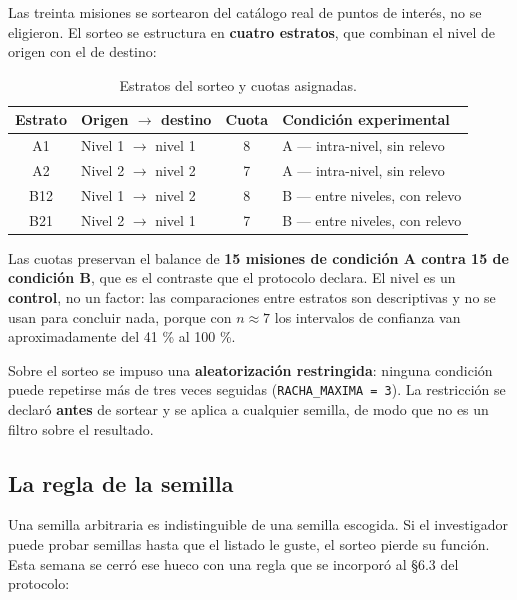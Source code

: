 \documentclass[12pt,letterpaper]{article}
\begin{document}
Las treinta misiones se sortearon del catálogo real de puntos de interés, no se eligieron. El sorteo se estructura en \textbf{cuatro estratos}, que combinan el nivel de origen con el de destino:

\begin{table}[H]
    \centering
    \small
    \caption{Estratos del sorteo y cuotas asignadas.}
    \label{tab:estratos}
    \begin{tabular}{@{}clcp{5.4cm}@{}}
        \toprule
        \textbf{Estrato} & \textbf{Origen $\rightarrow$ destino} & \textbf{Cuota} & \textbf{Condición experimental} \\ \midrule
        A1 & Nivel 1 $\rightarrow$ nivel 1 & 8 & A --- intra-nivel, sin relevo \\ \addlinespace
        A2 & Nivel 2 $\rightarrow$ nivel 2 & 7 & A --- intra-nivel, sin relevo \\ \addlinespace
        B12 & Nivel 1 $\rightarrow$ nivel 2 & 8 & B --- entre niveles, con relevo \\ \addlinespace
        B21 & Nivel 2 $\rightarrow$ nivel 1 & 7 & B --- entre niveles, con relevo \\ \bottomrule
    \end{tabular}
\end{table}

Las cuotas preservan el balance de \textbf{15 misiones de condición A contra 15 de condición B}, que es el contraste que el protocolo declara. El nivel es un \textbf{control}, no un factor: las comparaciones entre estratos son descriptivas y no se usan para concluir nada, porque con $n \approx 7$ los intervalos de confianza van aproximadamente del 41 \% al 100 \%.

Sobre el sorteo se impuso una \textbf{aleatorización restringida}: ninguna condición puede repetirse más de tres veces seguidas (\texttt{RACHA\_MAXIMA = 3}). La restricción se declaró \textbf{antes} de sortear y se aplica a cualquier semilla, de modo que no es un filtro sobre el resultado.

\subsection{La regla de la semilla}

Una semilla arbitraria es indistinguible de una semilla escogida. Si el investigador puede probar semillas hasta que el listado le guste, el sorteo pierde su función. Esta semana se cerró ese hueco con una regla que se incorporó al \S 6.3 del protocolo:
\end{document}
